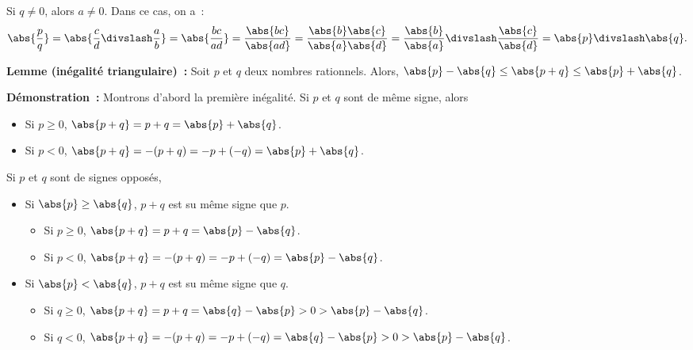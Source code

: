     Si $q \neq 0$, alors $a \neq 0$. 
    Dans ce cas, on a :
    \begin{equation*}
        \abs{\frac{p}{q}} 
        = \abs{\frac{c}{d} \divslash \frac{a}{b}}
        = \abs{\frac{b c}{a d}}
        = \frac{\abs{b c}}{\abs{a d}}
        = \frac{\abs{b} \abs{c}}{\abs{a} \abs{d}}
        = \frac{\abs{b}}{\abs{a}} \divslash \frac{\abs{c}}{\abs{d}}
        = \abs{p} \divslash \abs{q} .
    \end{equation*}
    
    \done

\medskip

\noindent\textbf{Lemme (inégalité triangulaire) :} Soit $p$ et $q$ deux nombres rationnels. 
    Alors, $\abs{p} - \abs{q} \leq \abs{p + q} \leq \abs{p} + \abs{q}$.

\medskip

\noindent\textbf{Démonstration :}
    Montrons d'abord la première inégalité. 
    Si $p$ et $q$ sont de même signe, alors 
    \begin{itemize}[nosep]
        \item Si $p \geq 0$, $\abs{p + q} = p + q = \abs{p} + \abs{q}$.
        \item Si $p < 0$, $\abs{p + q} = -(p + q) = - p + (- q) = \abs{p} + \abs{q}$.
    \end{itemize}
    Si $p$ et $q$ sont de signes opposés, 
    \begin{itemize}[nosep]
        \item Si $\abs{p} \geq \abs{q}$, $p + q$ est su même signe que $p$.
        \begin{itemize}[nosep]
            \item Si $p \geq 0$, $\abs{p + q} = p + q = \abs{p} - \abs{q}$.
            \item Si $p < 0$, $\abs{p + q} = -(p + q) = -p + (-q) = \abs{p} - \abs{q}$.
        \end{itemize}
        \item Si $\abs{p} < \abs{q}$, $p + q$ est su même signe que $q$.
        \begin{itemize}[nosep]
            \item Si $q \geq 0$, $\abs{p + q} = p + q = \abs{q} - \abs{p} > 0 > \abs{p} - \abs{q}$.
            \item Si $q < 0$, $\abs{p + q} = -(p + q) = -p + (-q) = \abs{q} - \abs{p} > 0 > \abs{p} - \abs{q}$.
        \end{itemize}
    \end{itemize}

